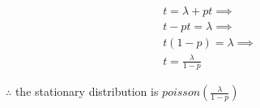 \documentclass{article}\usepackage[]{graphicx}\usepackage[]{color}
\begin{document}
\begin{equation}
  \begin{split}
  t = \lambda + pt \implies \\
  t - pt = \lambda \implies \\
  t(1-p) = \lambda \implies \\
  t = \frac{\lambda}{1-p}
  \end{split}
\end{equation}

$\therefore$ the stationary distribution is $poisson(\frac{\lambda}{1-p})$
\end{document}
